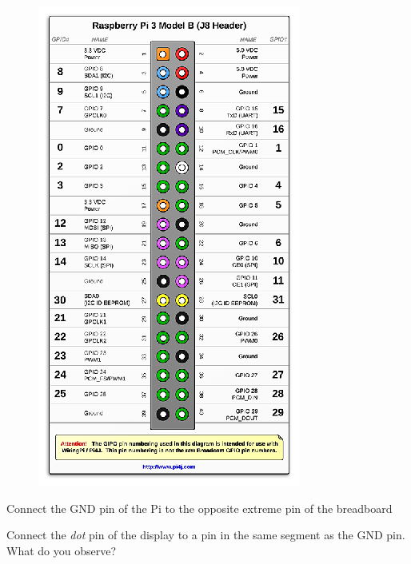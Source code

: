 \begin{figure}
\begin{center}
\includegraphics[width=\columnwidth]{./chapter1/figs/gpio1}
\end{center}
\label{fig_1_3b}	
\end{figure}
\renewcommand{\thefigure}{\theproblem}
%
\begin{problem}
	Connect the GND pin of the Pi to the opposite extreme pin of the breadboard
\end{problem}
\begin{problem}
	Connect the {\em dot} pin of the display to a pin in the same segment as the GND pin.  What do you observe?
\end{problem}
